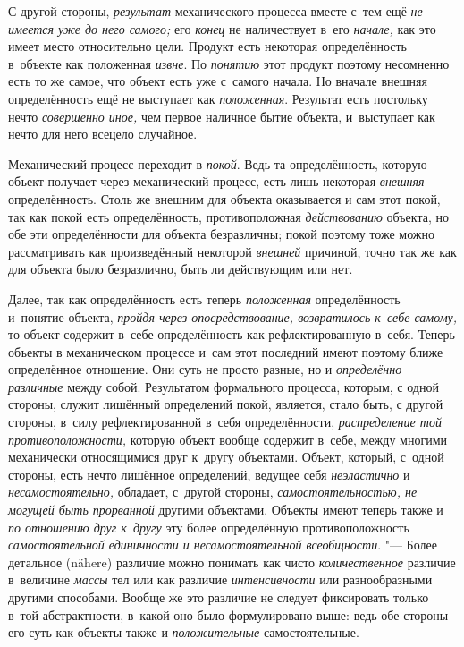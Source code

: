 С другой стороны, {\em результат} механического процесса вместе с~тем ещё
{\em не имеется уже до него самого;} его {\em конец} не наличествует в~его
{\em начале,} как это имеет место относительно цели. Продукт есть некоторая
определённость в~объекте как положенная {\em извне}. По {\em понятию}
этот продукт поэтому несомненно есть то же самое, что объект
есть уже с~самого начала. Но вначале внешняя определённость ещё не
выступает как {\em положенная}. Результат есть постольку нечто
{\em совершенно иное,} чем первое наличное бытие объекта, и~выступает
как нечто для него всецело случайное.


Механический процесс переходит в {\em покой}. Ведь та
определённость, которую объект получает через механический процесс, есть
лишь некоторая {\em внешняя}
определённость. Столь же внешним для объекта оказывается и
сам этот покой, так как покой есть определённость, противоположная
{\em действованию}
объекта, но обе эти определённости для объекта безразличны;
покой поэтому тоже можно рассматривать как произведённый некоторой
{\em внешней} причиной,
точно так же как для объекта было безразлично, быть ли действующим или нет.

Далее, так как определённость есть теперь
{\em положенная}
определённость и~понятие объекта,
{\em пройдя через опосредствование,
возвратилось к~себе самому,} то объект содержит в~себе
определённость как рефлектированную в~себя. Теперь объекты в
механическом процессе и~сам этот последний имеют поэтому ближе определённое
отношение. Они суть не просто разные, но и
{\em определённо различные}
между собой. Результатом формального процесса, которым, с
одной стороны, служит лишённый определений покой, является, стало быть, с
другой стороны, в~силу рефлектированной в~себя определённости,
{\em распределение той
противоположности,} которую объект вообще содержит в~себе,
между многими механически относящимися друг к~другу объектами. Объект,
который, с~одной стороны, есть нечто лишённое определений, ведущее себя
{\em неэластично} и
{\em несамостоятельно,}
обладает, с~другой стороны,
{\em самостоятельностью, не могущей быть
прорванной} другими объектами. Объекты имеют теперь также и
{\em по отношению друг к~другу}
эту более определённую противоположность
{\em самостоятельной единичности и
несамостоятельной всеобщности}. "--- Более детальное (nähere)
различие можно понимать как чисто
{\em количественное}
различие в~величине
{\em массы} тел или как
различие {\em интенсивности}
или разнообразными другими способами. Вообще же это различие
не следует фиксировать только в~той абстрактности, в~какой оно было
формулировано выше: ведь обе стороны его суть как объекты также и
{\em положительные}
самостоятельные.

